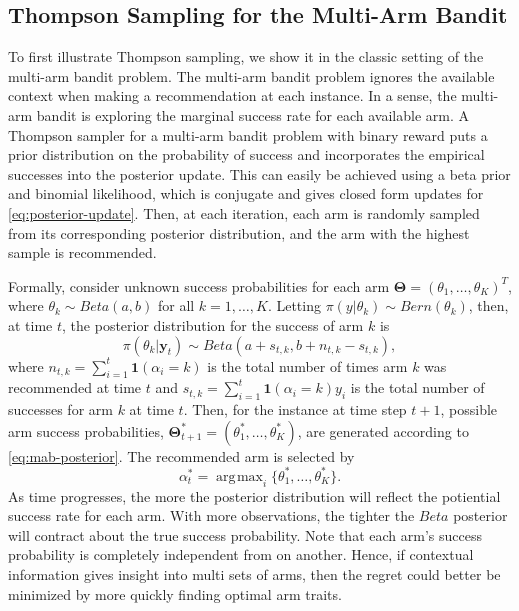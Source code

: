 \documentclass[12pt]{article}
\DeclareMathOperator*{\argmax}{\arg\!\max}
\begin{document}
\subsection{Thompson Sampling for the Multi-Arm Bandit}

To first illustrate Thompson sampling, we show it in the classic setting of the 
multi-arm bandit problem. 
The multi-arm bandit problem ignores the available context when making a 
recommendation at each instance.
In a sense, the multi-arm bandit is exploring the marginal success rate for each
available arm.
A Thompson sampler for a multi-arm bandit problem with binary reward puts a prior
distribution on the probability of success and incorporates the empirical successes
into the posterior update.
This can easily be achieved using a beta prior and binomial likelihood, which is
conjugate and gives closed form updates for \eqref{eq:posterior-update}.
Then, at each iteration, each arm is randomly sampled from its corresponding 
posterior distribution, and the arm with the highest sample is recommended.

Formally, consider unknown success probabilities for each arm 
$\bm{\Theta} = (\theta_1, \ldots, \theta_K)^T$,
where 
$\theta_k \sim Beta(a,b)$
for all $k = 1, \ldots, K$.
Letting 
$\pi(y \vert \theta_k) \sim Bern(\theta_k)$, 
then, at time $t$, the posterior distribution for the success of arm $k$ is
\begin{equation}
\pi(\theta_k \vert \bm{y}_t) \sim 
Beta(a + s_{t,k}, b + n_{t,k} - s_{t,k}),
\label{eq:mab-posterior}
\end{equation}
where 
$n_{t,k} = \sum_{i = 1}^{t} \bm{1}(\alpha_i = k)$
is the total number of times arm $k$ was recommended at time $t$
and
$s_{t,k} = \sum_{i = 1}^{t} \bm{1}(\alpha_i = k) y_i$ 
is the total number of successes for arm $k$ at time $t$.
Then, for the instance at time step $t + 1$, possible arm success probabilities,
$\bm{\Theta}_{t+1}^* = (\theta_1^*, \ldots, \theta_K^*)$,
are generated according to \eqref{eq:mab-posterior}.
The recommended arm is selected by 
\begin{equation}
\alpha_t^* = \argmax_i \{\theta_1^*, \ldots, \theta_K^*\}.
\end{equation}
As time progresses, the more the posterior distribution will reflect the potiential 
success rate for each arm.
With more observations, the tighter the $Beta$ posterior will contract about the 
true success probability.
Note that each arm's success probability is completely independent from on another.
Hence, if contextual information gives insight into multi sets of arms, then the
regret could better be minimized by more quickly finding optimal arm traits.
\end{document}
